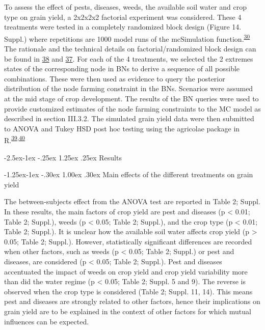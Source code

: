 \documentclass[12pt,oneside]{article}
\makeatletter
\renewcommand\paragraph{\@startsection{paragraph}{4}{\z@}%
            {-2.5ex\@plus -1ex \@minus -.25ex}%
            {1.25ex \@plus .25ex}%
            {\normalfont\normalsize\bfseries}}
\renewcommand\subparagraph{\@startsection{subparagraph}{5}{\z@}%
            {-1.25ex\@plus -1ex \@minus -.30ex}%
            {1.00ex \@plus .30ex}%
            {\normalfont\normalsize\bfseries\itshape}}
\makeatother
\begin{document}
To assess the effect of pests, diseases, weeds, the available soil water
and crop type on grain yield, a 2x2x2x2 factorial experiment was
considered. These 4 treatments were tested in a completely randomized
block design (Figure 14. Suppl.) where repetitions are 1000 model runs
of the mcSimulation
function.\textsuperscript{\protect\hyperlink{ref-Luedeling_and_Goehring_2018}{30}}
The rationale and the technical details on factorial/randomized block
design can be found in
\protect\hyperlink{ref-Panse_and_Sukhatme_1957}{38} and
\protect\hyperlink{ref-Gomez_and_Gomez_1984}{37}. For each of the 4
treatments, we selected the 2 extremes states of the corresponding node
in BNs to derive a sequence of all possible combinations. These were
then used as evidence to query the posterior distribution of the node
farming constraint in the BNs. Scenarios were assumed at the mid stage
of crop development. The results of the BN queries were used to provide
customized estimates of the node farming constraints to the MC model as
described in section III.3.2. The simulated grain yield data were then
submitted to ANOVA and Tukey HSD post hoc testing using the agricolae
package in
R.\textsuperscript{\protect\hyperlink{ref-DeMendiburu_2016}{39},\protect\hyperlink{ref-RCoreTeam_2018}{40}}

\hypertarget{results}{%
\paragraph{Results}\label{results}}

\hypertarget{main-effects-of-the-different-treatments-on-grain-yield}{%
\subparagraph{Main effects of the different treatments on grain
yield}\label{main-effects-of-the-different-treatments-on-grain-yield}}

The between-subjects effect from the ANOVA test are reported in Table 2;
Suppl. In these results, the main factors of crop yield are pest and
diseases (p \textless{} 0.01; Table 2; Suppl.), weeds (p \textless{}
0.05; Table 2; Suppl.), and the crop type (p \textless{} 0.01; Table 2;
Suppl.). It is unclear how the available soil water affects crop yield
(p \textgreater{} 0.05; Table 2; Suppl.). However, statistically
significant differences are recorded when other factors, such as weeds
(p \textless{} 0.05; Table 2; Suppl.) or pest and diseases, are
considered (p \textless{} 0.05; Table 2; Suppl.). Pest and diseases
accentuated the impact of weeds on crop yield and crop yield variability
more than did the water regime (p \textless{} 0.05; Table 2; Suppl. 5
and 9). The reverse is observed when the crop type is considered (Table
2; Suppl. 11, 14). This means pest and diseases are strongly related to
other factors, hence their implications on grain yield are to be
explained in the context of other factors for which mutual influences
can be expected.
\end{document}
